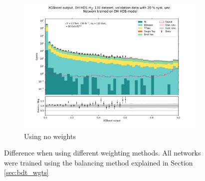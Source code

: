 \documentclass[12pt, a4paper]{book}
\begin{document}
\begin{figure}[!ht]
\begin{subfigure}[b]{0.49\textwidth}
      \includegraphics[width=1\textwidth]{No_wgt/VAL.pdf}
      \caption{Using no weights}
   \end{subfigure}
   \caption[Validation plots when using different weighting methods on BDTs]{Difference when using different weighting methods. All networks were trained using the balancing method explained in Section \ref{sec:bdt_wgts}}\label{fig:BDT_wgts}
\end{figure}
\end{document}
